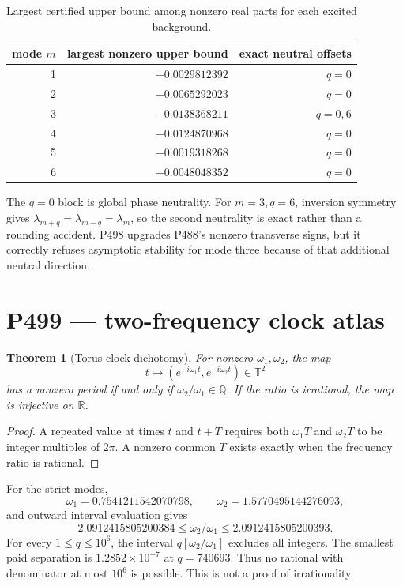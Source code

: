 \documentclass[11pt,a4paper]{article}
\newtheorem{theorem}{Theorem}[section]
\theoremstyle{definition}
\theoremstyle{remark}
\newcommand{\R}{\mathbb R}
\begin{document}
\begin{table}[H]
\centering
\caption{Largest certified upper bound among nonzero real parts for each excited background.}
\begin{tabular}{@{}rrr@{}}
\toprule
mode $m$ & largest nonzero upper bound & exact neutral offsets\\
\midrule
1 & $-0.0029812392$ & $q=0$\\
2 & $-0.0065292023$ & $q=0$\\
3 & $-0.0138368211$ & $q=0,6$\\
4 & $-0.0124870968$ & $q=0$\\
5 & $-0.0019318268$ & $q=0$\\
6 & $-0.0048048352$ & $q=0$\\
\bottomrule
\end{tabular}
\end{table}

The $q=0$ block is global phase neutrality. For $m=3,q=6$, inversion symmetry gives $\lambda_{m+q}=\lambda_{m-q}=\lambda_m$, so the second neutrality is exact rather than a rounding accident. P498 upgrades P488's nonzero transverse signs, but it correctly refuses asymptotic stability for mode three because of that additional neutral direction.

\section{P499 --- two-frequency clock atlas}

\begin{theorem}[Torus clock dichotomy]
For nonzero $\omega_1,\omega_2$, the map
\[
 t\longmapsto(e^{-i\omega_1t},e^{-i\omega_2t})\in\mathbb T^2
\]
has a nonzero period if and only if $\omega_2/\omega_1\in\mathbb Q$. If the ratio is irrational, the map is injective on $\R$.
\end{theorem}
\begin{proof}
A repeated value at times $t$ and $t+T$ requires both $\omega_1T$ and $\omega_2T$ to be integer multiples of $2\pi$. A nonzero common $T$ exists exactly when the frequency ratio is rational.
\end{proof}

For the strict modes,
\[
 \omega_1=0.7541211542070798,\qquad
 \omega_2=1.5770495144276093,
\]
and outward interval evaluation gives
\[
 2.0912415805200384\le\omega_2/\omega_1
 \le2.0912415805200393.
\]
For every $1\le q\le10^6$, the interval $q[\omega_2/\omega_1]$ excludes all integers. The smallest paid separation is $1.2852\times10^{-7}$ at $q=740693$. Thus no rational with denominator at most $10^6$ is possible. This is not a proof of irrationality.
\end{document}
